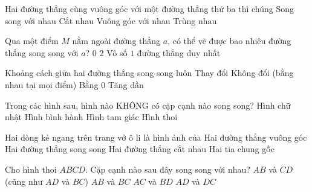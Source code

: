 \begin{ex} %
Hai đường thẳng cùng vuông góc với một đường thẳng thứ ba thì chúng
\choice
{\True Song song với nhau}
{Cắt nhau}
{Vuông góc với nhau}
{Trùng nhau}
\end{ex}

\begin{ex} %
Qua một điểm $M$ nằm ngoài đường thẳng $a$, có thể vẽ được bao nhiêu đường thẳng song song với $a$?
\choice
{$0$}
{$2$}
{Vô số}
{\True $1$ đường thẳng duy nhất}
\end{ex}

\begin{ex} %
Khoảng cách giữa hai đường thẳng song song luôn
\choice
{Thay đổi}
{\True Không đổi (bằng nhau tại mọi điểm)}
{Bằng 0}
{Tăng dần}
\end{ex}

\begin{ex} %
Trong các hình sau, hình nào KHÔNG có cặp cạnh nào song song?
\choice
{Hình chữ nhật}
{Hình bình hành}
{\True Hình tam giác}
{Hình thoi}
\end{ex}

\begin{ex} %
Hai dòng kẻ ngang trên trang vở ô li là hình ảnh của
\choice
{Hai đường thẳng vuông góc}
{\True Hai đường thẳng song song}
{Hai đường thẳng cắt nhau}
{Hai tia chung gốc}
\end{ex}

\begin{ex} %
Cho hình thoi $ABCD$. Cặp cạnh nào sau đây song song với nhau?
\choice
{\True $AB$ và $CD$ (cũng như $AD$ và $BC$)}
{$AB$ và $BC$}
{$AC$ và $BD$}
{$AD$ và $DC$}
\end{ex}

